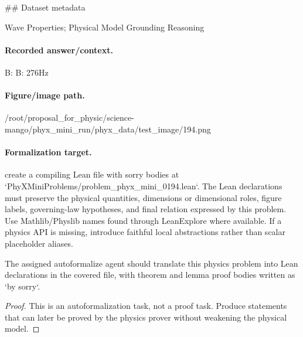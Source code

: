 \#\# Dataset metadata

Wave Properties; Physical Model Grounding Reasoning

\paragraph{Recorded answer/context.}
B: B: 276Hz

\paragraph{Figure/image path.}
/root/proposal\_for\_physic/science-mango/phyx\_mini\_run/phyx\_data/test\_image/194.png

\paragraph{Formalization target.}
create a compiling Lean file with sorry bodies at `PhyXMiniProblems/problem\_phyx\_mini\_0194.lean`. The Lean declarations must preserve the physical quantities, dimensions or dimensional roles, figure labels, governing-law hypotheses, and final relation expressed by this problem.
Use Mathlib/Physlib names found through LeanExplore where available. If a physics API is missing, introduce faithful local abstractions rather than scalar placeholder aliases.

\begin{theorem}
\label{thm:physics:phyx_mini_0194:target}
The assigned autoformalize agent should translate this physics problem into Lean declarations in the covered file, with theorem and lemma proof bodies written as `by sorry`.
\end{theorem}
\begin{proof}
This is an autoformalization task, not a proof task. Produce statements that can later be proved by the physics prover without weakening the physical model.
\end{proof}

